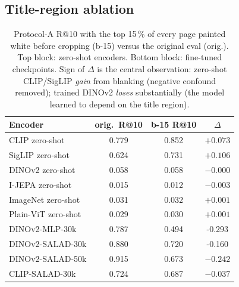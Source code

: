 \documentclass{article}
\begin{document}
\subsection{Title-region ablation}

\begin{table}[t]
\caption{Protocol-A R@10 with the top 15\,\% of every page painted
white before cropping (b-15) versus the original eval (orig.).
Top block: zero-shot encoders. Bottom block: fine-tuned checkpoints.
Sign of $\Delta$ is the central observation: zero-shot CLIP/SigLIP
\emph{gain} from blanking (negative confound removed); trained
DINOv2 \emph{loses} substantially (the model learned to depend on
the title region).}
\label{tab:blank_protA}
\centering
\small
\begin{tabular}{lccc}
\toprule
Encoder & orig.\ R@10 & b-15 R@10 & $\Delta$ \\
\midrule
\rowcolor{cITC} CLIP zero-shot         & 0.779 & 0.852 & $+0.073$ \\
\rowcolor{cITC} SigLIP zero-shot       & 0.624 & 0.731 & $+0.106$ \\
\rowcolor{cSSL} DINOv2 zero-shot       & 0.058 & 0.058 & $-0.000$ \\
\rowcolor{cSSL} I-JEPA zero-shot       & 0.015 & 0.012 & $-0.003$ \\
\rowcolor{cSUP} ImageNet zero-shot     & 0.031 & 0.032 & $+0.001$ \\
\rowcolor{cRND} Plain-ViT zero-shot    & 0.029 & 0.030 & $+0.001$ \\
\midrule
\rowcolor{cFT}  DINOv2-MLP-30k         & 0.787 & 0.494 & -0.293 \\
\rowcolor{cFT}  DINOv2-SALAD-30k       & 0.880 & 0.720 & -0.160 \\
\rowcolor{cFT}  DINOv2-SALAD-50k       & 0.915 & 0.673 & $-0.242$ \\
\rowcolor{cFT}  CLIP-SALAD-30k         & 0.724 & 0.687 & $-0.037$ \\
\bottomrule
\end{tabular}
\end{table}
\end{document}
